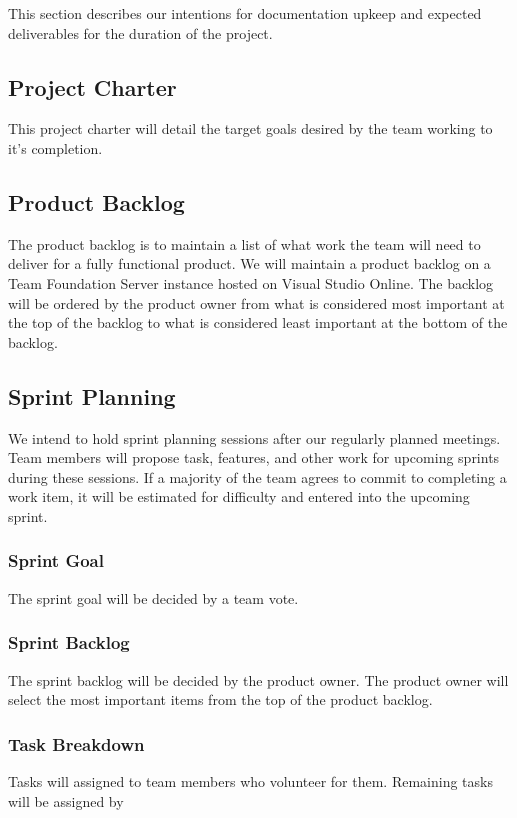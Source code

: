 This section describes our intentions for documentation upkeep and expected deliverables for the duration of the project.

\subsection{Project Charter}
This project charter will detail the target goals desired by the team working to it's completion.

\subsection{Product Backlog}
The product backlog is to maintain a list of what work the team will need to deliver for a fully functional product. We will maintain a product backlog on a Team Foundation Server instance hosted on Visual Studio Online. The backlog will be ordered by the product owner from what is considered most important at the top of the backlog to what is considered least important at the bottom of the backlog.

\subsection{Sprint Planning}
We intend to hold sprint planning sessions after our regularly planned meetings. Team members will propose task, features, and other work for upcoming sprints during these sessions. If a majority of the team agrees to commit to completing a work item, it will be estimated for difficulty and entered into the upcoming sprint.

\subsubsection{Sprint Goal}
The sprint goal will be decided by a team vote. 

\subsubsection{Sprint Backlog}
The sprint backlog will be decided by the product owner. The product owner will select the most important items from the top of the product backlog.

\subsubsection{Task Breakdown}
Tasks will assigned to team members who volunteer for them. Remaining tasks will be assigned by 

